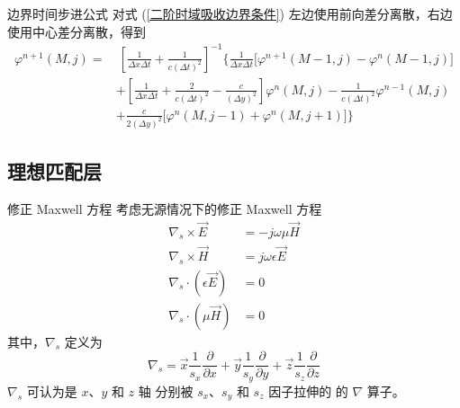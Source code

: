 \begin{theorem}{边界时间步进公式}
    对式 (\ref{二阶时域吸收边界条件}) 
    左边使用前向差分离散，右边使用中心差分离散，得到
    \begin{equation}
        \begin{aligned}
            \varphi^{n+1}(M,j)=
            &\ \left[\frac{1}{\Delta x\Delta t}+\frac{1}{c(\Delta t)^2}\right]^{-1}
            \Bigg\{
                \frac{1}{\Delta x\Delta t}\Big[
                    \varphi^{n+1}(M-1,j)-\varphi^{n}(M-1,j)
                \Big]\\
            &+\left[
                \frac{1}{\Delta x\Delta t}
                +\frac{2}{c(\Delta t)^2}
                -\frac{c}{(\Delta y)^2}
            \right]\varphi^{n}(M,j)
            -\frac{1}{c(\Delta t)^2}\varphi^{n-1}(M,j)\\
            &+\frac{c}{2(\Delta y)^2}\Big[
                \varphi^{n}(M,j-1)+\varphi^{n}(M,j+1)
            \Big]
            \Bigg\}
        \end{aligned}
    \end{equation}
\end{theorem}

\subsection{理想匹配层}

\begin{definition}{修正 Maxwell 方程}
    考虑无源情况下的修正 Maxwell 方程
    \begin{align}
        \nabla_s\times\vec{E}&=-j\omega\mu\vec{H}\\
        \nabla_s\times\vec{H}&=j\omega\epsilon\vec{E}\\
        \nabla_s\cdot(\epsilon\vec{E})&=0\\
        \nabla_s\cdot(\mu\vec{H})&=0
    \end{align}
    其中，$\nabla_s$ 定义为
    \begin{equation}
        \nabla_s=
        \vec{x}\frac{1}{s_x}\frac{\partial}{\partial x}
        +\vec{y}\frac{1}{s_y}\frac{\partial}{\partial y}
        +\vec{z}\frac{1}{s_z}\frac{\partial}{\partial z}
    \end{equation}
    $\nabla_s$ 可认为是 $x$、$y$ 和 $z$ 轴
    分别被 $s_x$、$s_y$ 和 $s_z$ 因子拉伸的
    的 $\nabla$ 算子。
\end{definition}

